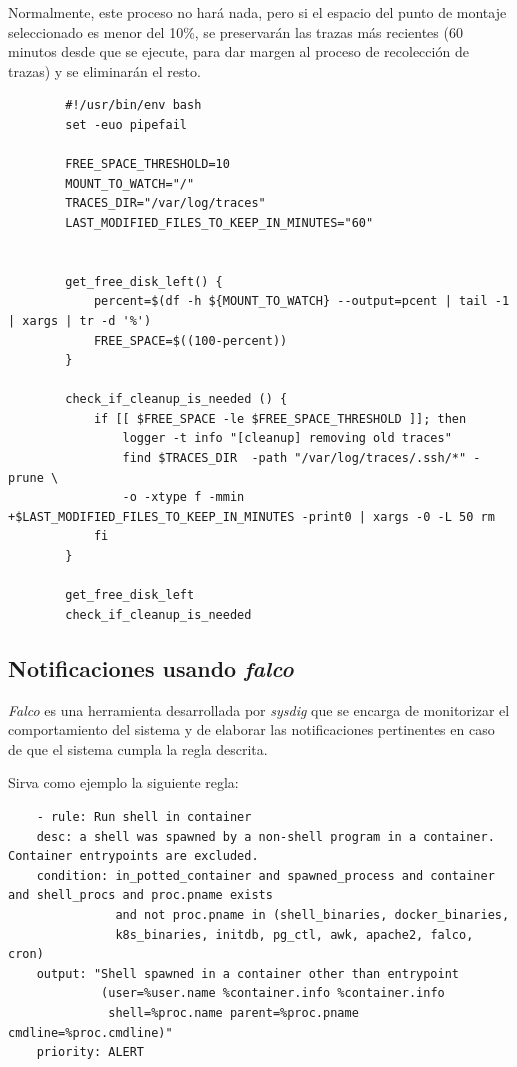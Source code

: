 Normalmente, este proceso no hará nada, pero si el espacio del punto de montaje seleccionado es menor del 10\%,
se preservarán las trazas más recientes (60 minutos desde que se ejecute, para dar margen al proceso de recolección de trazas) y se eliminarán el resto.

    \begin{verbatim}
        #!/usr/bin/env bash
        set -euo pipefail
        
        FREE_SPACE_THRESHOLD=10
        MOUNT_TO_WATCH="/"
        TRACES_DIR="/var/log/traces"
        LAST_MODIFIED_FILES_TO_KEEP_IN_MINUTES="60"
        
        
        get_free_disk_left() {
            percent=$(df -h ${MOUNT_TO_WATCH} --output=pcent | tail -1 | xargs | tr -d '%')
            FREE_SPACE=$((100-percent))
        }
        
        check_if_cleanup_is_needed () {
            if [[ $FREE_SPACE -le $FREE_SPACE_THRESHOLD ]]; then
                logger -t info "[cleanup] removing old traces"
                find $TRACES_DIR  -path "/var/log/traces/.ssh/*" -prune \
                -o -xtype f -mmin +$LAST_MODIFIED_FILES_TO_KEEP_IN_MINUTES -print0 | xargs -0 -L 50 rm
            fi
        }
        
        get_free_disk_left
        check_if_cleanup_is_needed
    \end{verbatim}
    

\subsection{Notificaciones usando \emph{falco}}

\emph{Falco} es una herramienta desarrollada por \emph{sysdig} que se encarga de monitorizar el comportamiento del sistema y de elaborar las notificaciones pertinentes en 
caso de que el sistema cumpla la regla descrita.

Sirva como ejemplo la siguiente regla:

\begin{verbatim}
    - rule: Run shell in container
    desc: a shell was spawned by a non-shell program in a container. Container entrypoints are excluded.
    condition: in_potted_container and spawned_process and container and shell_procs and proc.pname exists 
               and not proc.pname in (shell_binaries, docker_binaries, 
               k8s_binaries, initdb, pg_ctl, awk, apache2, falco, cron)
    output: "Shell spawned in a container other than entrypoint 
             (user=%user.name %container.info %container.info 
              shell=%proc.name parent=%proc.pname cmdline=%proc.cmdline)"
    priority: ALERT
\end{verbatim}
\bigskip

